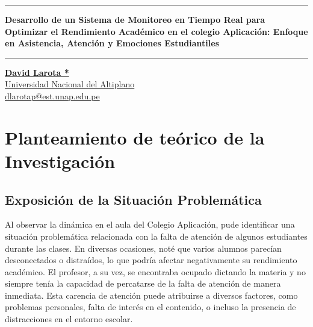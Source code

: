 \documentclass[12pt]{article}
\title{}
\author{Tú Nombre}
\date{\today}
\begin{document}
\textcolor{black}{\rule{0.9\linewidth}{1.5mm}} \par
\vspace*{3cm}
                \begin{minipage}{0.9\textwidth}
                    \centering
                    {\Large {\textbf{Desarrollo de un Sistema de Monitoreo en Tiempo Real para Optimizar el Rendimiento Académico en el colegio Aplicación: Enfoque en Asistencia, Atención y Emociones Estudiantiles}}}\par
                \end{minipage}
\vspace*{3cm}
\par \textcolor{black}{\rule{0.9\linewidth}{0.5mm}} \par

\href{mailto:dlarotap@est.unap.edu.pe}{\textbf{David Larota *}}  \\
\href{https://maps.app.goo.gl/y7MUTXXG2xKvnvZVA}{Universidad Nacional del Altiplano}\\
\href{mailto:dlarotap@est.unap.edu.pe}{dlarotap@est.unap.edu.pe}\\


\begin{abstract}

\end{abstract}

\newpage
\tableofcontents

\newpage
\section{Planteamiento de teórico de la Investigación}
\subsection{Exposición de la Situación Problemática}
Al observar la dinámica en el aula del Colegio Aplicación, pude identificar una situación problemática relacionada con la falta de atención de algunos estudiantes durante las clases. En diversas ocasiones, noté que varios alumnos parecían desconectados o distraídos, lo que podría afectar negativamente su rendimiento académico. El profesor, a su vez, se encontraba ocupado dictando la materia y no siempre tenía la capacidad de percatarse de la falta de atención de manera inmediata.
\espacio
Esta carencia de atención puede atribuirse a diversos factores, como problemas personales, falta de interés en el contenido, o incluso la presencia de distracciones en el entorno escolar.
\cite{atencion3}
\end{document}
